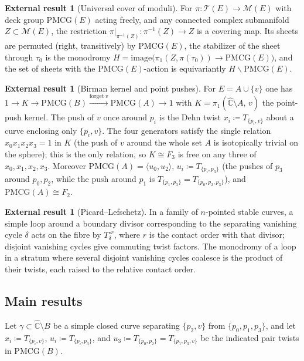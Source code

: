 \documentclass[11pt]{article}
\theoremstyle{definition}
\newtheorem{quoted}[theorem]{External result}
\theoremstyle{remark}
\newcommand{\Teich}{\mathcal T}
\newcommand{\MM}{\mathcal M}
\newcommand{\PMCG}{\mathrm{PMCG}}
\newcommand{\Chat}{\widehat{\mathbb C}}
\begin{document}
\begin{quoted}[Universal cover of moduli]\label{q:uc}
For $\pi:\Teich(E)\to\MM(E)$ with deck group $\PMCG(E)$ acting freely,
and any connected complex submanifold $Z\subset\MM(E)$, the
restriction $\pi|_{\pi^{-1}(Z)}:\pi^{-1}(Z)\to Z$ is a covering map.
Its sheets are permuted (right, transitively) by $\PMCG(E)$, the
stabilizer of the sheet through $\tau_0$ is the monodromy
$H=\mathrm{image}\bigl(\pi_1(Z,\pi(\tau_0))\to\PMCG(E)\bigr)$, and the
set of sheets with the $\PMCG(E)$-action is
equivariantly $H\backslash\PMCG(E)$.
\end{quoted}

\begin{quoted}[Birman kernel and point pushes]\label{q:birman}
For $E=A\cup\{v\}$ one has
$1\to K\to\PMCG(B)\xrightarrow{\mathrm{forget}\ v}\PMCG(A)\to1$ with
$K=\pi_1(\Chat\setminus A,\,v)$ the point-push kernel.  The push of $v$
once around $p_i$ is the Dehn twist $x_i\coloneqq T_{\{p_i,v\}}$ about
a curve enclosing only $\{p_i,v\}$.  The four generators satisfy the
single relation $x_0x_1x_2x_3=1$ in $K$ \textup{(}the push of $v$ around
the whole set $A$ is isotopically trivial on the sphere\textup{)}; this
is the only relation, so $K\cong F_3$ is free on any three of
$x_0,x_1,x_2,x_3$.  Moreover
$\PMCG(A)=\langle u_0,u_2\rangle$, $u_i\coloneqq T_{\{p_i,p_3\}}$
(the pushes of $p_3$ around $p_0,p_2$, while the push around $p_1$ is
$T_{\{p_1,p_3\}}=T_{\{p_0,p_2,p_3\}}$), and $\PMCG(A)\cong F_2$.
\end{quoted}

\begin{quoted}[Picard--Lefschetz]\label{q:pl}
In a family of $n$-pointed stable curves, a simple loop around a
boundary divisor corresponding to the separating vanishing cycle
$\delta$ acts on the fibre by $T_\delta^{\circ r}$, where $r$ is the
contact order with that divisor; disjoint vanishing cycles give
commuting twist factors.  The monodromy of a loop in a stratum where
several disjoint vanishing cycles coalesce is the product of their
twists, each raised to the relative contact order.
\end{quoted}

\subsection{Main results}

Let $\gamma\subset\Chat\setminus B$ be a simple closed curve separating
$\{p_2,v\}$ from $\{p_0,p_1,p_3\}$, and let $x_i\coloneqq
T_{\{p_i,v\}}$, $u_i\coloneqq T_{\{p_i,p_3\}}$, and
$u_3\coloneqq T_{\{p_0,p_2\}}=T_{\{p_1,p_3,v\}}$ be the indicated pair
twists in $\PMCG(B)$.
\end{document}
